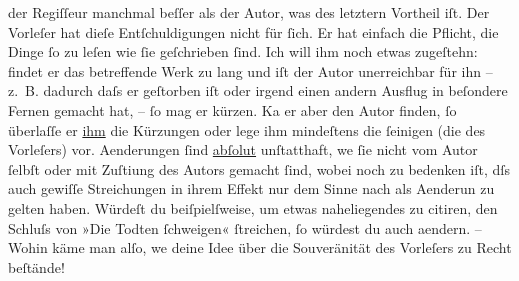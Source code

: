                {\pb}der Regiſſeur
               manchmal beſſer als der Autor, was des letztern Vortheil iſt. Der Vorleſer hat dieſe
               Entſchuldigungen nicht für{ }ſich. Er hat einfach die Pflicht, die Dinge{ }ſo zu leſen
               wie{ }ſie geſchrieben{ }ſind. Ich will ihm noch etwas zugeſtehn: findet er das
               betreffende Werk zu lang und iſt der Autor unerreichbar für ihn – z. B. dadurch daſs
               er geſtorben iſt oder irgend einen andern Ausflug in {\pb}beſondere Fernen
               gemacht hat, –{ }ſo mag er kürzen. Ka{\geminationn} er aber den Autor
               finden,{ }ſo überlaſſe er \uline{ihm} die Kürzungen oder lege
               ihm mindeſtens die{ }ſeinigen (die des Vorleſers) vor. Aenderungen{ }ſind \uline{abſolut} unſtatthaft, we{\geminationn}{ }ſie nicht vom Autor{ }ſelbſt oder mit Zuſti{\geminationm}ung des Autors gemacht{ }ſind, wobei noch zu bedenken
               iſt, dſs auch gewiſſe Streichungen in ihrem Effekt nur dem {\pb}Sinne nach als
                  Aenderun zu gelten haben. Würdeſt du beiſpielſweise, um etwas naheliegendes zu
               citiren, den Schluſs von »Die Todten{ }ſchweigen«{ }ſtreichen,{ }ſo würdest du auch aendern. – Wohin käme man \introOben{}alſo\introOben{}, we{\geminationn} deine Idee über die Souveränität des
               Vorleſers zu Recht beſtände!\pend
           
